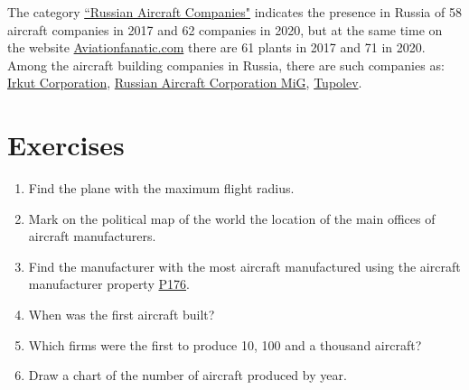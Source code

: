 The category \href{https://cutt.ly/NhrKnWn}{``Russian Aircraft Companies"} indicates the presence in Russia of 58 aircraft companies in 2017 and 
62 companies in 2020, but at the same time on the website \href{https://www.aviationfanatic.com/}{Aviationfanatic.com} there are 61 
plants in 2017 and 71 in 2020. Among the aircraft building companies in Russia, there are such companies as: \href{https://en.wikipedia.org/wiki/Irkut_Corporation}{Irkut Corporation}, 
\href{https://en.wikipedia.org/wiki/Russian_Aircraft_Corporation_MiG}{Russian Aircraft Corporation MiG}, 
\href{https://en.wikipedia.org/wiki/Tupolev}{Tupolev}.


\section{Exercises}

\begin{enumerate}
\item Find the plane with the maximum flight radius.
\item Mark on the political map of the world the location of the main offices of aircraft manufacturers.
\item Find the manufacturer with the most aircraft manufactured using the aircraft manufacturer property \href{https://www.wikidata.org/wiki/Property:P176}{P176}.
\item When was the first aircraft built?
\item Which firms were the first to produce 10, 100 and a thousand aircraft?
\item Draw a chart of the number of aircraft produced by year.
\end{enumerate}
